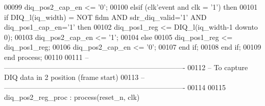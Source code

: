 \begin{DoxyCode}
00099             \textcolor{vhdlchar}{diq_pos2_cap_en} \textcolor{vhdlchar}{<=} \textcolor{vhdlchar}{'}\textcolor{vhdllogic}{}\textcolor{vhdllogic}{0}\textcolor{vhdlchar}{'};  
00100       \textcolor{keywordflow}{elsif} \textcolor{vhdlchar}{(}\textcolor{vhdlchar}{clk}\textcolor{vhdlchar}{'}\textcolor{vhdlkeyword}{event} \textcolor{keywordflow}{and} \textcolor{vhdlchar}{clk} \textcolor{vhdlchar}{=} \textcolor{vhdlchar}{'}\textcolor{vhdllogic}{}\textcolor{vhdllogic}{1}\textcolor{vhdlchar}{'}\textcolor{vhdlchar}{)} \textcolor{keywordflow}{then}
00101             \textcolor{keywordflow}{if} \textcolor{vhdlchar}{DIQ_l}\textcolor{vhdlchar}{(}\textcolor{vhdlchar}{iq_width}\textcolor{vhdlchar}{)} \textcolor{vhdlchar}{=} \textcolor{keywordflow}{NOT} \textcolor{vhdlchar}{fidm} \textcolor{keywordflow}{AND} \textcolor{vhdlchar}{sdr_diq_valid}\textcolor{vhdlchar}{=}\textcolor{vhdlchar}{'}\textcolor{vhdllogic}{}\textcolor{vhdllogic}{1}\textcolor{vhdlchar}{'} \textcolor{keywordflow}{AND} \textcolor{vhdlchar}{
      diq_pos1_cap_en}\textcolor{vhdlchar}{=}\textcolor{vhdlchar}{'}\textcolor{vhdllogic}{}\textcolor{vhdllogic}{1}\textcolor{vhdlchar}{'} \textcolor{keywordflow}{then} 
00102             \textcolor{vhdlchar}{diq_pos1_reg} \textcolor{vhdlchar}{<=} \textcolor{vhdlchar}{DIQ_l}\textcolor{vhdlchar}{(}\textcolor{vhdlchar}{iq_width}\textcolor{vhdlchar}{-}\textcolor{vhdllogic}{}\textcolor{vhdllogic}{1} \textcolor{keywordflow}{downto} \textcolor{vhdllogic}{}\textcolor{vhdllogic}{0}\textcolor{vhdlchar}{)};
00103                 \textcolor{vhdlchar}{diq_pos2_cap_en} \textcolor{vhdlchar}{<=} \textcolor{vhdlchar}{'}\textcolor{vhdllogic}{}\textcolor{vhdllogic}{1}\textcolor{vhdlchar}{'};
00104             \textcolor{keywordflow}{else} 
00105                 \textcolor{vhdlchar}{diq_pos1_reg} \textcolor{vhdlchar}{<=} \textcolor{vhdlchar}{diq_pos1_reg};
00106                 \textcolor{vhdlchar}{diq_pos2_cap_en} \textcolor{vhdlchar}{<=} \textcolor{vhdlchar}{'}\textcolor{vhdllogic}{}\textcolor{vhdllogic}{0}\textcolor{vhdlchar}{'};
00107             \textcolor{keywordflow}{end} \textcolor{keywordflow}{if}; 
00108         \textcolor{keywordflow}{end} \textcolor{keywordflow}{if};
00109     \textcolor{keywordflow}{end} \textcolor{keywordflow}{process};
00110 
00111 \textcolor{keyword}{-- ----------------------------------------------------------------------------}
00112 \textcolor{keyword}{-- To capture DIQ data in 2 position (frame start)}
00113 \textcolor{keyword}{-- ----------------------------------------------------------------------------}
00114 
00115  diq\_pos2\_reg\_proc : \textcolor{keywordflow}{process}(reset_n, clk)

\end{DoxyCode}
